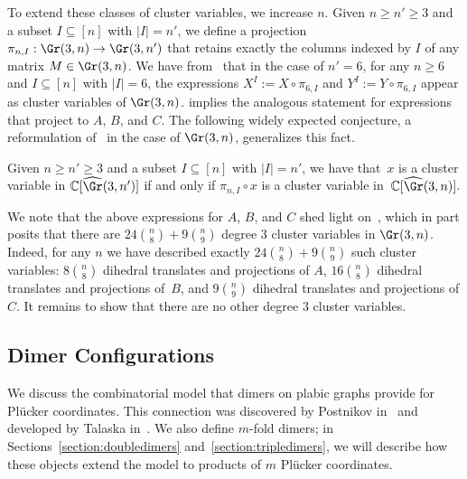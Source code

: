 To extend these classes of cluster variables, we increase $n$. Given $n \geq n' \geq 3$ and a subset $I \subseteq [n]$ with $|I|=n'$, we define a projection $\pi_{n,I}:\Gr(3,n) \rightarrow \Gr(3,n')$ that retains exactly the columns indexed by $I$ of any matrix $M \in \Gr(3,n)$. We have from~\cite{s06} that in the case of $n'=6$, for any $n\geq 6$ and $I \subseteq [n]$ with $|I|=6$, the expressions $X^I:=X \circ \pi_{6,I}$ and $Y^I:=Y \circ \pi_{6,I}$ appear as cluster variables of $\Gr(3,n)$. \cite[Theorem~8.8]{fominpasha2016} implies the analogous statement for expressions that project to $A$, $B$, and $C$.
The following widely expected conjecture, a reformulation of~\cite[Conjecture~3.2]{clustering} in the case of $\Gr(3,n)$, generalizes this fact.
\begin{conjecture}\label{conj:projections}
Given $n \geq n' \geq 3$ and a subset $I \subseteq [n]$ with $|I|=n'$, we have that~$x$ is a cluster variable in $\mathbb{C}[\widehat{\Gr}(3,n')]$ if and only if $\pi_{n,I} \circ x$ is a cluster variable in~$\mathbb{C}[\widehat{\Gr}(3,n)]$.
\end{conjecture}


We note that the above expressions for $A$, $B$, and $C$ shed light on~\cite[Conjecture~3.1]{clustering}, which in part posits that there are $24\binom{n}{8}+9\binom{n}{9}$ degree 3 cluster variables in $\Gr(3,n)$. Indeed, for any $n$ we have described exactly $24\binom{n}{8}+9\binom{n}{9}$ such cluster variables: $8\binom{n}{8}$ dihedral translates and projections of $A$, $16\binom{n}{8}$ dihedral translates and projections of~$B$, and $9\binom{n}{9}$ dihedral translates and projections of $C$. It remains to show that there are no other degree 3 cluster variables.

\subsection{Dimer Configurations}\label{subsection:dimers}
We discuss the combinatorial model that dimers on plabic graphs provide for Pl\"ucker coordinates. This connection was discovered by Postnikov in~\cite{p06} and developed by Talaska in~\cite{Tal}. We also define $m$-fold dimers; in Sections~\ref{section:doubledimers} and~\ref{section:tripledimers}, we will describe how these objects extend the model to products of $m$ Pl\"ucker coordinates.

